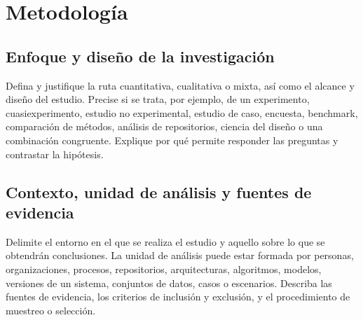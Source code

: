 \chapter{Metodología}
\label{cap:metodologia}


\section{Enfoque y diseño de la investigación}

Defina y justifique la ruta cuantitativa, cualitativa o mixta, así como el
alcance y diseño del estudio. Precise si se trata, por ejemplo, de un experimento,
cuasiexperimento, estudio no experimental, estudio de caso, encuesta, benchmark,
comparación de métodos, análisis de repositorios, ciencia del diseño o una
combinación congruente. Explique por qué permite responder las preguntas y
contrastar la hipótesis.


\section{Contexto, unidad de análisis y fuentes de evidencia}

Delimite el entorno en el que se realiza el estudio y aquello sobre lo que se
obtendrán conclusiones. La unidad de análisis puede estar formada por personas,
organizaciones, procesos, repositorios, arquitecturas, algoritmos, modelos,
versiones de un sistema, conjuntos de datos, casos o escenarios. Describa las
fuentes de evidencia, los criterios de inclusión y exclusión, y el procedimiento
de muestreo o selección.

